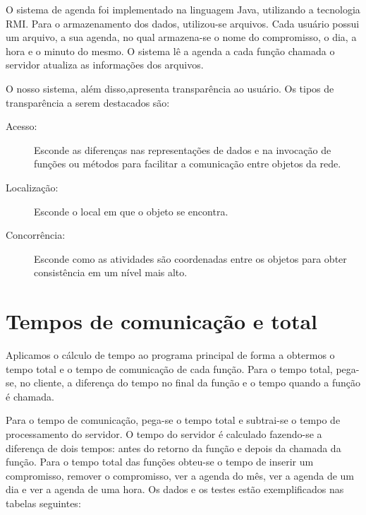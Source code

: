 \documentclass[10pt,a4paper]{article}
\begin{document}
O sistema de agenda foi implementado na linguagem Java, utilizando a tecnologia RMI. Para o armazenamento dos dados, utilizou-se arquivos. Cada
usuário possui um arquivo, a sua agenda, no qual armazena-se o nome do compromisso, o dia, a hora e o minuto do
mesmo. O sistema lê a agenda a cada função chamada o servidor atualiza as informações dos arquivos.

O nosso sistema, além disso,apresenta transparência ao usuário. Os tipos de transparência a serem destacados são:
\begin{description}
\item[Acesso:] Esconde as diferenças nas representações de dados e na invocação de funções ou métodos para facilitar a comunicação
  entre objetos da rede.
\item[Localização:] Esconde o local em que o objeto se encontra.
\item[Concorrência:] Esconde como as atividades são coordenadas entre os objetos para obter consistência em um nível mais
  alto.
\end{description}


\section{Tempos de comunicação e total}
Aplicamos o cálculo de tempo ao programa principal de forma a obtermos o tempo total e o tempo de comunicação de cada função. Para o tempo total, pega-se, no cliente, a diferença do tempo no final da função e o tempo quando a função é chamada.

Para o tempo de comunicação, pega-se o tempo total e subtrai-se o tempo de processamento do servidor. O tempo do servidor é calculado fazendo-se a diferença de dois tempos: antes do retorno da função e depois da chamada da função.
Para o tempo total das funções obteu-se o tempo de inserir um compromisso, remover o compromisso, ver a agenda
do mês, ver a agenda de um dia e ver a agenda de uma hora. Os dados e os testes estão exemplificados nas tabelas seguintes:
\end{document}
